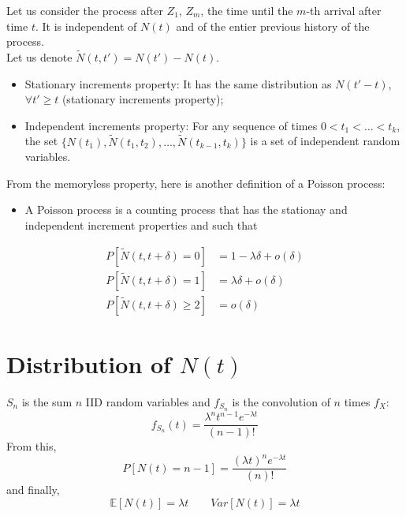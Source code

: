 \documentclass[12pt, openany]{report}
\newcommand{\E}{\mathbb{E}}
\theoremstyle{definition}
\begin{document}
Let us consider the process after $Z_1$, $Z_m$, the time until the $m$-th arrival after time $t$. It is independent of $N(t)$ and of the entier previous history of the process.\\
Let us denote $\tilde N(t,t') = N(t')-N(t)$. 
\begin{itemize}
  \item Stationary increments property: It has the same distribution as $N(t'-t)$, $\forall t'\ge t$ (stationary increments property);
  \item Independent increments property: For any sequence of times $0<t_1<\dots<t_k$, the set $\{N(t_1), \tilde N(t_1,t_2), \dots,\tilde N (t_{k-1}, t_k)\}$ is a set of independent random variables.
\end{itemize}
From the memoryless property, here is another definition of a Poisson process: \\
\begin{itemize}
  \item A Poisson process is a counting process that has the stationay and independent increment properties and such that 
\end{itemize}
\begin{equation}
  \begin{aligned}
    P[\tilde N(t, t+\delta)=0] &= 1-\lambda \delta +o(\delta)\\  P[\tilde N(t, t+\delta)=1] &= \lambda \delta +o(\delta)\\
    P[\tilde N(t, t+\delta)\ge2] &= o(\delta)
  \end{aligned}
\end{equation}
\section{Distribution of $N(t)$}
$S_n$ is the sum $n$ IID random variables and $f_{S_n}$ is the convolution of $n$ times $f_X$:
\begin{equation}
  f_{S_n}(t) = \frac{\lambda^n t^{n-1}e^{-\lambda t}}{(n-1)!}
\end{equation}
From this, 
\begin{equation}
  P[N(t)=n-1] = \frac{(\lambda t)^{n}e^{-\lambda t}}{(n)!}
\end{equation}
and finally, 
\begin{equation}
  \E[N(t)] = \lambda t\qquad Var[N(t)] = \lambda t
\end{equation}
\end{document}
